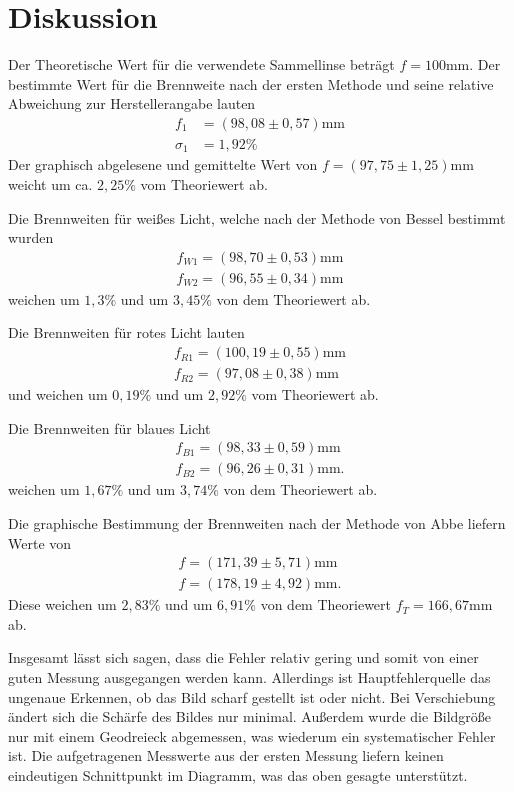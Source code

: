 \section{Diskussion}
\label{sec:Diskussion}

Der Theoretische Wert für die verwendete Sammellinse beträgt $f=100\si{\milli\meter}$.
Der bestimmte Wert für die Brennweite nach der ersten Methode und seine relative Abweichung zur Herstellerangabe lauten
\begin{align*}
f_1 &= (98,08 \pm 0,57) \si{\milli\meter}\\
\sigma_1 &= 1,92 \%
\end{align*}
Der graphisch abgelesene und gemittelte Wert von $f = (97,75 \pm 1,25)\si{\milli\meter}$ weicht um ca. $2,25 \%$ vom Theoriewert ab.


Die Brennweiten für weißes Licht, welche nach der Methode von Bessel bestimmt wurden 
\begin{align*}
f_{W1} = (98,70 \pm 0,53) \si{\milli\meter} \\
f_{W2} = (96,55 \pm 0,34) \si{\milli\meter} 
\end{align*}
weichen um $1,3 \%$ und um $3,45 \%$ von dem Theoriewert ab. 

Die Brennweiten für rotes Licht lauten
\begin{align*}
f_{R1} = (100,19 \pm 0,55) \si{\milli\meter} \\
f_{R2} = (97,08 \pm 0,38) \si{\milli\meter} 
\end{align*}
und weichen um $0,19 \%$ und um $2,92 \%$ vom Theoriewert ab.

Die Brennweiten für blaues Licht
\begin{align*}
f_{B1} = (98,33 \pm 0,59) \si{\milli\meter} \\
f_{B2} = (96,26 \pm 0,31) \si{\milli\meter} .
\end{align*}
weichen um $1,67 \%$ und um $3,74 \%$ von dem Theoriewert ab.

Die graphische Bestimmung der Brennweiten nach der Methode von Abbe liefern Werte von 
\begin{align*}
f = (171,39 \pm 5,71)\si{\milli\meter} \\
f = (178,19 \pm 4,92)\si{\milli\meter}.
\end{align*}
Diese weichen um $2,83 \%$ und um $6,91 \%$ von dem Theoriewert $f_T = 166,67 \si{\milli\meter}$ ab.

Insgesamt lässt sich sagen, dass die Fehler relativ gering und somit von einer guten Messung ausgegangen werden kann. Allerdings ist Hauptfehlerquelle
das ungenaue Erkennen, ob das Bild scharf gestellt ist oder nicht. Bei Verschiebung ändert sich die Schärfe des Bildes nur minimal. Außerdem wurde
die Bildgröße nur mit einem Geodreieck abgemessen, was wiederum ein systematischer Fehler ist.
Die aufgetragenen Messwerte aus der ersten Messung liefern keinen eindeutigen Schnittpunkt im Diagramm, was das oben gesagte unterstützt.

